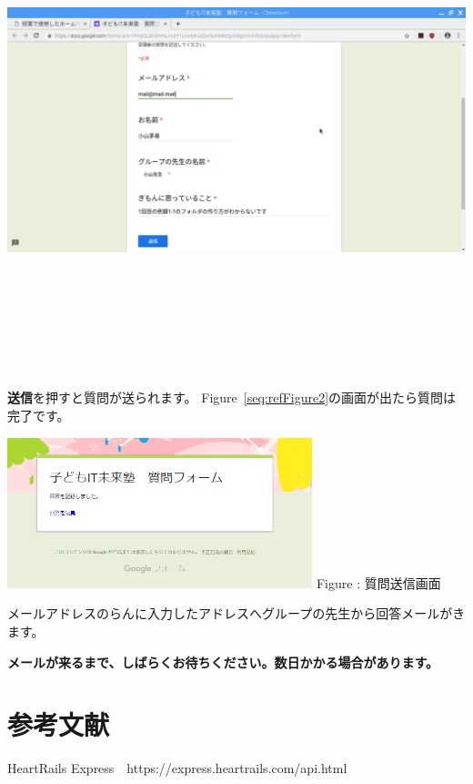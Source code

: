 \documentclass[a4paper,12pt,dvipdfmx]{jarticle}
\newcounter{Figure}
\renewcommand\theFigure{\arabic{Figure}}
\begin{document}
\begin{center}
\includegraphics[width=13.707cm,height=14.097cm]{textbook-img068.png}

\end{center}

\bigskip


\bigskip

\textbf{送信}を押すと質問が送られます。
Figure~\ref{seq:refFigure2}の画面が出たら質問は完了です。



\begin{center}
\begin{minipage}{8.871cm}
{\upshape
\includegraphics[width=8.871cm,height=4.374cm]{textbook-img069.png}
 \newline
Figure {\theFigure\label{seq:refFigure2}}: 質問送信画面}
\end{minipage}
\end{center}
メールアドレスのらんに入力したアドレスへグループの先生から回答メールがきます。

{\bfseries
\textmd{メールが来るまで、しばらくお待ちください。数日かかる場合があります。}}

\bigskip
\section{参考文献}
HeartRails Express　https://express.heartrails.com/api.html
\end{document}
